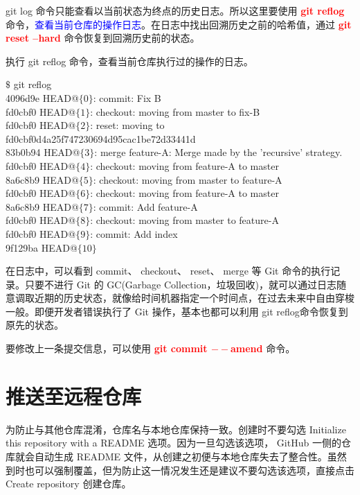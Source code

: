 \documentclass[12pt,a4paper]{article}
\begin{document}
git log 命令只能查看以当前状态为终点的历史日志。所以这里要使用 \textcolor{red}{\bf git reflog} 命令，\textcolor{blue}{查看当前仓库的操作日志}。在日志中找出回溯历史之前的哈希值，通过 \textcolor{red}{\bf git reset --hard} 命令恢复到回溯历史前的状态。

执行 git reflog 命令，查看当前仓库执行过的操作的日志。
\begin{tcolorbox}[colback=green!5,colframe=green!40!black,title= ]
$\$$ git reflog \\
4096d9e HEAD@$\{0\}$: commit: Fix B \\
fd0cbf0 HEAD@$\{1\}$: checkout: moving from master to fix-B \\
fd0cbf0 HEAD@$\{2\}$: reset: moving to fd0cbf0d4a25f747230694d95cac1be72d33441d \\
83b0b94 HEAD@$\{3\}$: merge feature-A: Merge made by the 'recursive' strategy. \\
fd0cbf0 HEAD@$\{4\}$: checkout: moving from feature-A to master \\
8a6c8b9 HEAD@$\{5\}$: checkout: moving from master to feature-A \\
fd0cbf0 HEAD@$\{6\}$: checkout: moving from feature-A to master \\
8a6c8b9 HEAD@$\{7\}$: commit: Add feature-A \\
fd0cbf0 HEAD@$\{8\}$: checkout: moving from master to feature-A \\
fd0cbf0 HEAD@$\{9\}$: commit: Add index \\
9f129ba HEAD@$\{10\}$
\end{tcolorbox}

在日志中，可以看到 commit、 checkout、 reset、 merge 等 Git 命令的执行记录。只要不进行 Git 的 GC(Garbage Collection，垃圾回收)，就可以通过日志随意调取近期的历史状态，就像给时间机器指定一个时间点，在过去未来中自由穿梭一般。即便开发者错误执行了 Git 操作，基本也都可以利用 git reflog命令恢复到原先的状态。


要修改上一条提交信息，可以使用 \textcolor{red}{\bf git commit $--$amend} 命令。


\section{推送至远程仓库}
为防止与其他仓库混淆，仓库名与本地仓库保持一致。创建时不要勾选 Initialize this repository with a README 选项。因为一旦勾选该选项， GitHub 一侧的仓库就会自动生成 README 文件，从创建之初便与本地仓库失去了整合性。虽然到时也可以强制覆盖，但为防止这一情况发生还是建议不要勾选该选项，直接点击 Create repository 创建仓库。
\end{document}
